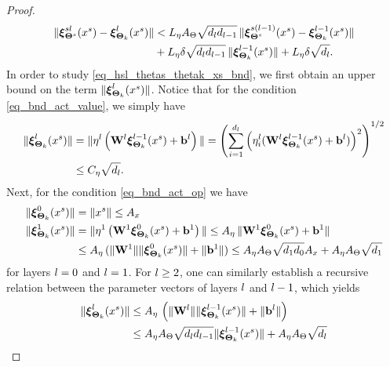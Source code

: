 \documentclass[review,supplement,onefignum,onetabnum]{siamonline250211}
\begin{document}
\begin{proof}
\begin{equation}
\label{eq_hsl_thetas_thetak_xs_bnd}
\begin{split}
\| \boldsymbol{\xi}^{sl}_{\boldsymbol{\Theta}^{s}}(x^s) - \boldsymbol{\xi}^{l}_{\boldsymbol{\Theta}_k}(x^s)  \|   
&< 
 {L_\eta} 
 {A_\Theta} \sqrt{{d_l} {d_{l-1}}} \,  \|   \boldsymbol{\xi}^{s(l-1)}_{\boldsymbol{\Theta}^{s}}(x^s)  - \boldsymbol{\xi}^{l-1}_{\boldsymbol{\Theta}_k}(x^s)  \| \\
 &+{L_\eta}
 \delta \sqrt{{d_l} {d_{l-1}}} \, \| \boldsymbol{\xi}^{l-1}_{\boldsymbol{\Theta}_k}(x^s) \|
 +{L_\eta}
 \delta \sqrt{{d_l}}.
\end{split}
\end{equation}
%
In order to study \eqref{eq_hsl_thetas_thetak_xs_bnd}, we first obtain an upper bound on the term $\| \boldsymbol{\xi}^{l}_{\boldsymbol{\Theta}_k}(x^s) \|$. Notice that for the condition \eqref{eq_bnd_act_value}, we simply have 
%
\begin{equation}
\label{eq_bnd_hidl_ito_beta}
\begin{split}
\| \boldsymbol{\xi}^{l}_{\boldsymbol{\Theta}_k}(x^s)  \| 
&=
\| \eta^l \left(  \mathbf{W}^{l}    \boldsymbol{\xi}^{l-1}_{\boldsymbol{\Theta}_k}(x^s)  + \mathbf{b}^{l}  \right) \| 
= \left( 
\sum_{i=1}^{{d_l}}
 \left( \eta^l_i  ( \mathbf{W}^{l}    \boldsymbol{\xi}^{l-1}_{\boldsymbol{\Theta}_k}(x^s)  + \mathbf{b}^{l}  ) \right)^2
  \right)^{1/2} \\
&  \leq {C_\eta} \sqrt{{d_l}}.
 \end{split}
\end{equation}
%
Next, for the condition \eqref{eq_bnd_act_op} we have
%
\begin{equation*}
\begin{split}
\|  \boldsymbol{\xi}^{0}_{\boldsymbol{\Theta}_k}(x^s) \| &=  \| x^s \| \leq {A_x} \\
\|  \boldsymbol{\xi}^{1}_{\boldsymbol{\Theta}_k}(x^s) \|  & = \| \eta^1 \left( \mathbf{W}^{1} \boldsymbol{\xi}^{0}_{\boldsymbol{\Theta}_k}(x^s) + \mathbf{b}^{1} \right) \|
\leq 
{A_\eta} \, \| \mathbf{W}^{1} \boldsymbol{\xi}^{0}_{\boldsymbol{\Theta}_k}(x^s) + \mathbf{b}^{1} \| \\
& \leq
{A_\eta} \, (  \| \mathbf{W}^{1} \|  \| \boldsymbol{\xi}^{0}_{\boldsymbol{\Theta}_k}(x^s) \| +  \| \mathbf{b}^{1} \| )
\leq {A_\eta}  {A_\Theta} \sqrt{{d_1} {d_0}}  {A_x} +  {A_\eta} {A_\Theta} \sqrt{{d_1}}
\end{split}
\end{equation*}
%
for layers $l=0$ and $l=1$. For $l \geq 2$, one can similarly establish a recursive relation between the parameter vectors of layers $l$ and $l-1$, which yields 
%
\begin{equation*}
\begin{split}
\|  \hidl_{\boldsymbol{\Theta}_k}(\xs) \|  
&\leq 
\Bopeta \, \left(  \| \Wl \|  \| \hidlm_{\boldsymbol{\Theta}_k}(\xs) \| +  \| \bl \| \right) \\
&\leq 
\Bopeta  \Bnet \sqrt{\dl \dlm}  \| \hidlm_{\boldsymbol{\Theta}_k}(\xs) \|  +  \Bopeta \Bnet \sqrt{\dl} \\

\end{split}
\end{equation*}
\end{proof}
\end{document}
